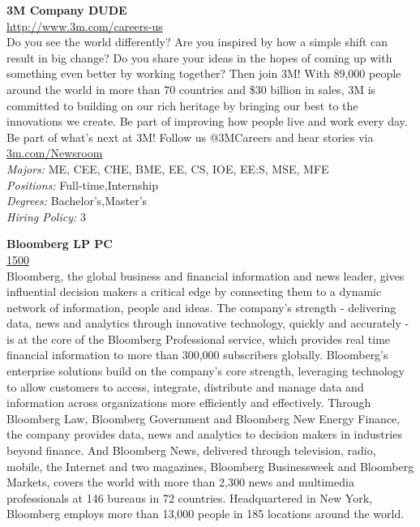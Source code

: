 \documentclass[twoside]{article}
\begin{document}
    \begin{center}\begin{multicols}{2}
    \begin{minipage}{.95\columnwidth}{\Large\bf 3M Company \hfill DUDE}\\
    \url{http://www.3m.com/careers-us}\\
    Do you see the world differently? Are you inspired by how a simple shift can result in big change? Do you share your ideas in the hopes of coming up with something even better by working together? Then join 3M! With 89,000 people around the world in more than 70 countries and \$30 billion in sales, 3M is committed to building on our rich heritage by bringing our best to the innovations we create. Be part of improving how people live and work every day. Be part of what's next at 3M! Follow us @3MCareers and hear stories via \url{3m.com/Newsroom}\\
    \emph{Majors:} ME, CEE, CHE, BME, EE, CS, IOE, EE:S, MSE, MFE\\
    \emph{Positions:} Full-time,Internship\\
    \emph{Degrees:} Bachelor's,Master's\\
    \emph{Hiring Policy:} 3\\
\end{minipage}
 \begin{minipage}{.95\columnwidth}{\Large\bf Bloomberg LP \hfill PC}\\
    \url{1500}\\
    Bloomberg, the global business and financial information and news leader, gives influential decision makers a critical edge by connecting them to a dynamic network of information, people and ideas. The company's strength - delivering data, news and analytics through innovative technology, quickly and accurately - is at the core of the Bloomberg Professional service, which provides real time financial information to more than 300,000 subscribers globally. Bloomberg's enterprise solutions build on the company's core strength, leveraging technology to allow customers to access, integrate, distribute and manage data and information across organizations more efficiently and effectively. Through Bloomberg Law, Bloomberg Government and Bloomberg New Energy Finance, the company provides data, news and analytics to decision makers in industries beyond finance. And Bloomberg News, delivered through television, radio, mobile, the Internet and two magazines, Bloomberg Businessweek and Bloomberg Markets, covers the world with more than 2,300 news and multimedia professionals at 146 bureaus in 72 countries. Headquartered in New York, Bloomberg employs more than 13,000 people in 185 locations around the world.\\

\end{minipage}
\end{multicols}
\end{center}
\end{document}
